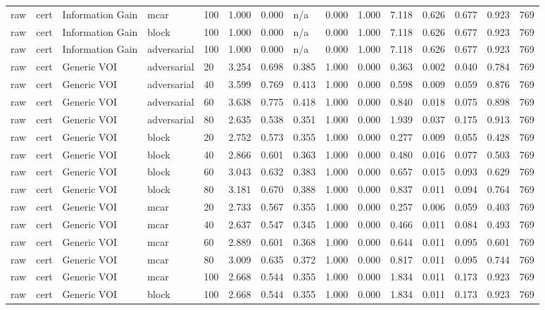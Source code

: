 \begin{table}[!ht]
{\begin{tabular}{lllllllllllllll}
raw & cert & Information Gain & mcar & 100 & 1.000 & 0.000 & n/a & 0.000 & 1.000 & 7.118 & 0.626 & 0.677 & 0.923 & 769 \\
raw & cert & Information Gain & block & 100 & 1.000 & 0.000 & n/a & 0.000 & 1.000 & 7.118 & 0.626 & 0.677 & 0.923 & 769 \\
raw & cert & Information Gain & adversarial & 100 & 1.000 & 0.000 & n/a & 0.000 & 1.000 & 7.118 & 0.626 & 0.677 & 0.923 & 769 \\
raw & cert & Generic VOI & adversarial & 20 & 3.254 & 0.698 & 0.385 & 1.000 & 0.000 & 0.363 & 0.002 & 0.040 & 0.784 & 769 \\
raw & cert & Generic VOI & adversarial & 40 & 3.599 & 0.769 & 0.413 & 1.000 & 0.000 & 0.598 & 0.009 & 0.059 & 0.876 & 769 \\
raw & cert & Generic VOI & adversarial & 60 & 3.638 & 0.775 & 0.418 & 1.000 & 0.000 & 0.840 & 0.018 & 0.075 & 0.898 & 769 \\
raw & cert & Generic VOI & adversarial & 80 & 2.635 & 0.538 & 0.351 & 1.000 & 0.000 & 1.939 & 0.037 & 0.175 & 0.913 & 769 \\
raw & cert & Generic VOI & block & 20 & 2.752 & 0.573 & 0.355 & 1.000 & 0.000 & 0.277 & 0.009 & 0.055 & 0.428 & 769 \\
raw & cert & Generic VOI & block & 40 & 2.866 & 0.601 & 0.363 & 1.000 & 0.000 & 0.480 & 0.016 & 0.077 & 0.503 & 769 \\
raw & cert & Generic VOI & block & 60 & 3.043 & 0.632 & 0.383 & 1.000 & 0.000 & 0.657 & 0.015 & 0.093 & 0.629 & 769 \\
raw & cert & Generic VOI & block & 80 & 3.181 & 0.670 & 0.388 & 1.000 & 0.000 & 0.837 & 0.011 & 0.094 & 0.764 & 769 \\
raw & cert & Generic VOI & mcar & 20 & 2.733 & 0.567 & 0.355 & 1.000 & 0.000 & 0.257 & 0.006 & 0.059 & 0.403 & 769 \\
raw & cert & Generic VOI & mcar & 40 & 2.637 & 0.547 & 0.345 & 1.000 & 0.000 & 0.466 & 0.011 & 0.084 & 0.493 & 769 \\
raw & cert & Generic VOI & mcar & 60 & 2.889 & 0.601 & 0.368 & 1.000 & 0.000 & 0.644 & 0.011 & 0.095 & 0.601 & 769 \\
raw & cert & Generic VOI & mcar & 80 & 3.009 & 0.635 & 0.372 & 1.000 & 0.000 & 0.817 & 0.011 & 0.095 & 0.744 & 769 \\
raw & cert & Generic VOI & mcar & 100 & 2.668 & 0.544 & 0.355 & 1.000 & 0.000 & 1.834 & 0.011 & 0.173 & 0.923 & 769 \\
raw & cert & Generic VOI & block & 100 & 2.668 & 0.544 & 0.355 & 1.000 & 0.000 & 1.834 & 0.011 & 0.173 & 0.923 & 769 \\

\end{tabular}}
\end{table}
